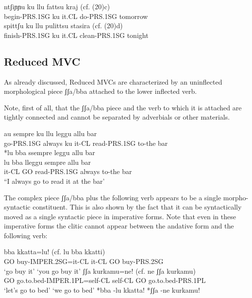 \documentclass[output=paper]{langscibook}
\begin{document}
\ea \label{ac21}
    \ea \label{ac21a}\gll ntʃiɲɲu     ku  llu   fattsu     kraj  (cf. (20)c) \\
     begin-PRS.1SG  ku  it.CL do-PRS.1SG  tomorrow\\
    \ex \label{ac21b}\gll spittʃu      ku  llu   pulittsu     stasira (cf. (20)d) \\
     finish-PRS.1SG ku it.CL clean-PRS.1SG  tonight\\
    \z
\z


\subsection{Reduced MVC}

As already discussed, Reduced MVCs are characterized by an uninflected morphological piece ʃʃa/bba attached to the lower inflected verb.   

Note, first of all, that the ʃʃa/bba piece and the verb to which it is attached are tightly connected and cannot be separated by adverbials or other materials. 

\ea \label{ac22}
    \ea \label{ac22a}\gll au       sempre  ku  llu   leggu       allu  bar\\
    go-PRS.1SG   always   ku  it-CL  read-PRS.1SG to-the bar\\
    \ex \label{ac22b} *lu bba ssempre leggu allu bar\\
    \ex \label{ac22c}\gll lu    bba lleggu       sempre  allu   bar \\
    it-CL   GO  read-PRS.1SG  always  to-the   bar \\
  \glt  “I always go to read it at the bar’
  \z
\z

The complex piece ʃʃa/bba plus the following verb appears to be a single morpho-syntactic constituent.  This is also shown by the fact that it can be syntactically moved as a single syntactic piece in imperative forms. Note that even in these imperative forms the clitic cannot appear between the andative form and the following verb:

\ea \label{ac23}
    \ea \label{ac23a}\gll bba  kkatta=lu!      (cf. lu   bba  kkatti)\\
    GO buy-IMPER.2SG=it-CL   {} it-CL GO  buy-PRS.2SG \\
    \glt ‘go buy it’   \hspace{8em}         ‘you go buy it’
  \ex \label{ac23b}\gll ʃʃa  kurkamu=ne!    (cf. ne   ʃʃa   kurkamu)\\
    GO go.to.bed-IMPER.1PL=self-CL  { } self-CL GO  go.to.bed-PRS.1PL \\
    \glt ‘let’s go to bed’  \hspace{3.25cm}   ‘we go to bed’
  \ex  \label{ac23c}*bba -lu kkatta!  
  \ex \label{ac23d}*ʃʃa -ne kurkamu!  
\end{document}
